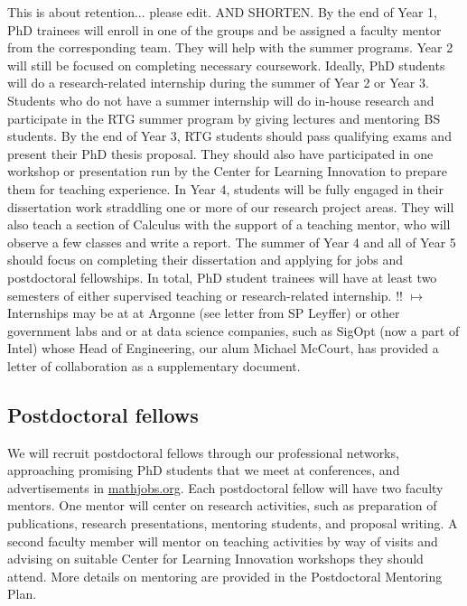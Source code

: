 \documentclass[11pt]{NSFamsart}
\begin{document}
{\color{red}This is about retention... please edit. AND SHORTEN.}
By the end of Year 1, PhD trainees will enroll in one of the groups and be assigned a faculty mentor from the corresponding team. They will   help with the summer programs.   Year 2
will still be focused on completing necessary coursework.
Ideally, PhD students will do a research-related internship during the summer of Year 2 or Year 3. Students who do not have
a summer internship will do in-house research and participate in the RTG summer program
by giving lectures and mentoring BS students. By the end of Year 3, RTG students
should pass qualifying exams and present their PhD thesis proposal. They should also have participated in one   workshop or presentation run by the Center for Learning Innovation to prepare them for teaching experience. In Year 4, students will be fully engaged in their dissertation work straddling one or more of our research project areas. They will also teach a section of Calculus with the support of a teaching
mentor, who will observe a few classes and write a report. The summer of Year 4 and all of Year 5 should focus on completing their dissertation and applying for jobs and postdoctoral fellowships.
In total, PhD student trainees will have at least two semesters of either supervised teaching or research-related internship. 
{\color{red} !! $\mapsto$ } Internships may be at at Argonne (see letter from SP Leyffer) or other government labs and or at data science companies, such as SigOpt (now a part of Intel) whose Head of Engineering, our alum Michael McCourt, has provided a letter  of collaboration as a supplementary document. 


\subsection*{Postdoctoral fellows}
We will recruit postdoctoral fellows through our professional networks, approaching promising PhD students that we meet at conferences, and advertisements in \url{mathjobs.org}. Each postdoctoral fellow will have two faculty mentors. One mentor will center on research activities, such as preparation of 
publications, research presentations, mentoring students, and proposal writing. A second faculty member will mentor on teaching activities by way of visits and advising on suitable Center for Learning Innovation workshops they should attend. More details on mentoring are provided in the Postdoctoral Mentoring Plan.
\end{document}
